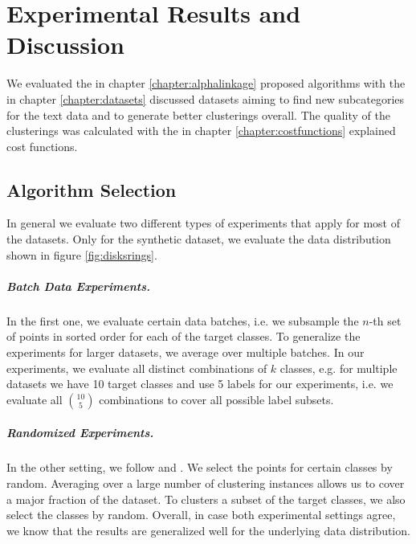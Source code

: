 \chapter{Experimental Results and Discussion}
\label{sec:results}


We evaluated the in chapter \ref{chapter:alphalinkage} proposed algorithms with the in chapter \ref{chapter:datasets} discussed datasets aiming to find new subcategories for the text data and to generate better clusterings overall. The quality of the clusterings was calculated with the in chapter \ref{chapter:costfunctions} explained cost functions.

\section{Algorithm Selection}

In general we evaluate two different types of experiments that apply for most of the datasets. Only for the synthetic dataset, we evaluate the data distribution shown in figure \ref{fig:disksrings}.

\paragraph{Batch Data Experiments.} In the first one, we evaluate certain data batches, i.e. we subsample the $n$-th set of points in sorted order for each of the target classes. To generalize the experiments for larger datasets, we average over multiple batches. In our experiments, we evaluate all distinct combinations of $k$ classes, e.g. for multiple datasets we have 10 target classes and use 5 labels for our experiments, i.e. we evaluate all $10 \choose 5$ combinations to cover all possible label subsets.

\paragraph{Randomized Experiments.} In the other setting, we follow \cite{NIPS2016_6385} and \cite{pmlr-v70-finn17a}. We select the points for certain classes by random. Averaging over a large number of clustering instances allows us to cover a major fraction of the dataset. To clusters a subset of the target classes, we also select the classes by random. Overall, in case both experimental settings agree, we know that the results are generalized well for the underlying data distribution.

